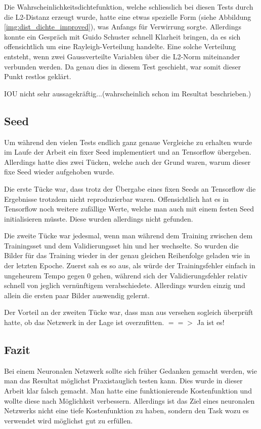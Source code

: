 Die Wahrscheinlichkeitsdichtefunktion, welche schliesslich bei diesen Tests durch die L2-Distanz erzeugt wurde, hatte eine etwas spezielle Form (siehe Abbildung \ref{img:dist_dichte_improved}), was Anfangs für Verwirrung sorgte. 
Allerdings konnte ein Gespräch mit Guido Schuster \cite{PrivateCommunication} schnell Klarheit bringen, da es sich \grqq{}offensichtlich\grqq{} um eine Rayleigh-Verteilung handelte. 
Eine solche Verteilung entsteht, wenn zwei Gaussverteilte Variablen über die L2-Norm miteinander verbunden werden.
Da genau dies in diesem Test geschieht, war somit dieser Punkt restlos geklärt.

IOU nicht sehr aussagekräftig...(wahrscheinlich schon im Resultat beschrieben.)

\subsection{Seed}
Um während den vielen Tests endlich ganz genaue Vergleiche zu erhalten wurde im Laufe der Arbeit ein fixer Seed implementiert und an Tensorflow übergeben.
Allerdings hatte dies zwei Tücken, welche auch der Grund waren, warum dieser fixe Seed wieder aufgehoben wurde.

Die erste Tücke war, dass trotz der Übergabe eines fixen Seeds an Tensorflow die Ergebnisse trotzdem nicht reproduzierbar waren.
Offensichtlich hat es in Tensorflow noch weitere zufällige Werte, welche man auch mit einem festen Seed initialisieren müsste.
Diese wurden allerdings nicht gefunden.

Die zweite Tücke war jedesmal, wenn man während dem Training zwischen dem Trainingsset und dem Validierungsset hin und her wechselte.
So wurden die Bilder für das Training wieder in der genau gleichen Reihenfolge geladen wie in der letzten Epoche.
Zuerst sah es so aus, als würde der Trainingsfehler einfach in ungeheurem Tempo gegen 0 gehen, während sich der Validierungsfehler relativ schnell von jeglich vernünftigem verabschiedete.
Allerdings wurden einzig und allein die ersten paar Bilder auswendig gelernt.

Der Vorteil an der zweiten Tücke war, dass man aus versehen sogleich überprüft hatte, ob das Netzwerk in der Lage ist overzufitten. $==>$ Ja ist es!

\subsection{Fazit}
Bei einem Neuronalen Netzwerk sollte sich früher Gedanken gemacht werden, wie man das Resultat möglichst Praxistauglich testen kann.
Dies wurde in dieser Arbeit klar falsch gemacht.
Man hatte eine funktionierende Kostenfunktion und wollte diese nach Möglichkeit verbessern.
Allerdings ist das Ziel eines neuronalen Netzwerks nicht eine tiefe Kostenfunktion zu haben, sondern den Task wozu es verwendet wird möglichst gut zu erfüllen.
